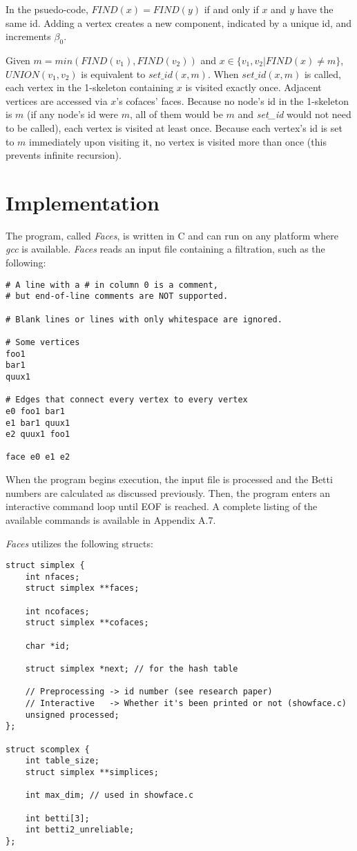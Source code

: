\documentclass{article}
\begin{document}
In the psuedo-code, $FIND(x) = FIND(y)$ if and only if $x$ and $y$
have the same id. Adding a vertex creates a new component,
indicated by a unique id, and increments $\beta_0$.

Given $m = min(FIND(v_1),FIND(v_2))$ and
$x \in \{ v_1,v_2 \vert FIND(x) \neq m \}$,
$UNION(v_1, v_2)$ is equivalent to $set\_id(x,m)$.
When $set\_id(x,m)$ is called, each vertex in the 1-skeleton containing
$x$ is visited exactly once. Adjacent vertices are accessed via
$x$'s cofaces' faces. Because no node's id in the 1-skeleton is $m$
(if any node's id were $m$, all of them would be $m$ and \emph{set\_id}
would not need to be called), each vertex is visited at least once.
Because each vertex's id is set to $m$ immediately upon visiting it,
no vertex is visited more than once (this prevents infinite recursion).


\section{Implementation}
The program, called \emph{Faces}, is written in C and can run
on any platform where \emph{gcc} is available. \emph{Faces} reads
an input file containing a filtration, such as the following:
\begin{verbatim}
# A line with a # in column 0 is a comment,
# but end-of-line comments are NOT supported.

# Blank lines or lines with only whitespace are ignored.

# Some vertices
foo1
bar1
quux1

# Edges that connect every vertex to every vertex
e0 foo1 bar1
e1 bar1 quux1
e2 quux1 foo1

face e0 e1 e2
\end{verbatim}

When the program begins execution, the input file is processed and
the Betti numbers are calculated as discussed previously.
Then, the program enters an interactive command loop until EOF
is reached. A complete listing of the available commands is
available in Appendix A.7.

\emph{Faces} utilizes the following structs:
\begin{verbatim}
struct simplex {
    int nfaces;
    struct simplex **faces;

    int ncofaces;
    struct simplex **cofaces;

    char *id;

    struct simplex *next; // for the hash table

    // Preprocessing -> id number (see research paper)
    // Interactive   -> Whether it's been printed or not (showface.c)
    unsigned processed;
};

struct scomplex {
    int table_size;
    struct simplex **simplices;

    int max_dim; // used in showface.c

    int betti[3];
    int betti2_unreliable;
};
\end{verbatim}
\end{document}
